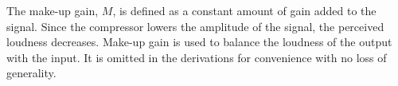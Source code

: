\documentclass[../main2.tex]{subfiles}
\begin{document}
The make-up gain, $M$, is defined as a constant amount of gain added to the signal. Since the compressor lowers the amplitude of the signal, the perceived loudness decreases. Make-up gain is used to balance the loudness of the output with the input. It is omitted in the derivations for convenience with no loss of generality.
\end{document}
